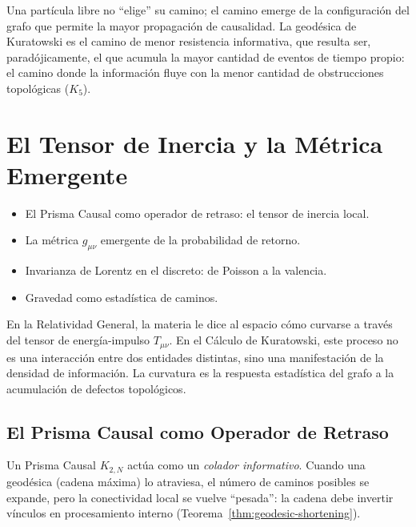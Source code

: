 \documentclass[11pt, a4paper, openany]{book}
\newenvironment{introduction}[1][Sinopsis del M\'odulo]{%
  \begin{tcolorbox}[
    enhanced,colback=structure!5,colframe=structure,
    colbacktitle=structure,coltitle=white,
    fonttitle=\small\bfseries,title={#1},
    arc=2pt,boxrule=0.7pt,
    left=8pt,right=8pt,top=6pt,bottom=6pt,
    before skip=12pt,after skip=12pt
  ]\itshape\begin{itemize}[leftmargin=*,itemsep=2pt,parsep=0pt]
}{%
  \end{itemize}\end{tcolorbox}
}
\begin{document}
\noindent
Una part\'icula libre no ``elige'' su camino; el camino emerge de la
configuraci\'on del grafo que permite la mayor propagaci\'on de
causalidad. La geod\'esica de Kuratowski es el camino de menor
resistencia informativa, que resulta ser, parad\'ojicamente, el que
acumula la mayor cantidad de eventos de tiempo propio: el camino donde
la informaci\'on fluye con la menor cantidad de obstrucciones
topol\'ogicas ($K_5$).

\chapter{El Tensor de Inercia y la M\'etrica Emergente}

\begin{introduction}
  \item El Prisma Causal como operador de retraso: el tensor de inercia local.
  \item La m\'etrica $g_{\mu\nu}$ emergente de la probabilidad de retorno.
  \item Invarianza de Lorentz en el discreto: de Poisson a la valencia.
  \item Gravedad como estad\'istica de caminos.
\end{introduction}

En la Relatividad General, la materia le dice al espacio c\'omo
curvarse a trav\'es del tensor de energ\'ia-impulso $T_{\mu\nu}$. En
el C\'alculo de Kuratowski, este proceso no es una interacci\'on entre
dos entidades distintas, sino una manifestaci\'on de la densidad de
informaci\'on. La curvatura es la respuesta estad\'istica del grafo a
la acumulaci\'on de defectos topol\'ogicos.

\section{El Prisma Causal como Operador de Retraso}

Un Prisma Causal $K_{2,N}$ act\'ua como un \emph{colador informativo}.
Cuando una geod\'esica (cadena m\'axima) lo atraviesa, el n\'umero de
caminos posibles se expande, pero la conectividad local se vuelve
``pesada'': la cadena debe invertir v\'inculos en procesamiento
interno (Teorema~\ref{thm:geodesic-shortening}).
\end{document}

